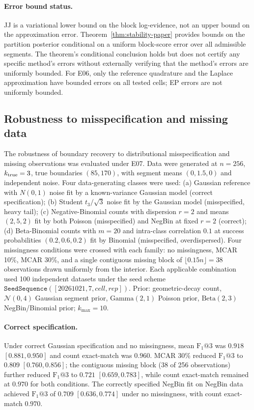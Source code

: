 \paragraph{Error bound status.}
JJ is a variational lower bound on the block log-evidence, not an upper bound on the
approximation error. Theorem~\ref{thm:stability-paper} provides bounds on the partition
posterior conditional on a uniform block-score error over all admissible segments. The
theorem's conditional conclusion holds but does not certify any specific method's errors
without externally verifying that the method's errors are uniformly bounded. For E06, only
the reference quadrature and the Laplace approximation have bounded errors on all tested
cells; EP errors are not uniformly bounded.





\FloatBarrier
\subsection{Robustness to misspecification and missing data}
The robustness of boundary recovery to distributional misspecification and missing
observations was evaluated under E07.
Data were generated at $n=256$, $k_{\rm true}=3$, true boundaries $(85,170)$,
with segment means $(0,1.5,0)$ and independent noise.
Four data-generating classes were used: (a) Gaussian reference with $N(0,1)$ noise
fit by a known-variance Gaussian model (correct specification);
(b) Student $t_3/\sqrt{3}$ noise fit by the Gaussian model (misspecified, heavy tail);
(c) Negative-Binomial counts with dispersion $r=2$ and means $(2,5,2)$ fit by both
Poisson (misspecified) and NegBin at fixed $r=2$ (correct);
(d) Beta-Binomial counts with $m=20$ and intra-class correlation $0.1$ at success
probabilities $(0.2,0.6,0.2)$ fit by Binomial (misspecified, overdispersed).
Four missingness conditions were crossed with each family: no missingness, MCAR 10\%,
MCAR 30\%, and a single contiguous missing block of $\lfloor 0.15n\rfloor = 38$
observations drawn uniformly from the interior.
Each applicable combination used 100 independent datasets under the
seed scheme $\mathtt{SeedSequence}([20261021,7,\textit{cell},\textit{rep}])$.
Prior: geometric-decay count, $\mathcal{N}(0,4)$ Gaussian segment prior,
$\mathrm{Gamma}(2,1)$ Poisson prior, $\mathrm{Beta}(2,3)$ NegBin/Binomial prior;
$k_{\max}=10$.

\paragraph{Correct specification.}
Under correct Gaussian specification and no missingness, mean
$\mathrm{F}_1@3$ was $0.918$ $[0.881, 0.950]$ and count exact-match was
$0.960$. MCAR 30\% reduced $\mathrm{F}_1@3$ to $0.809$ $[0.760, 0.856]$;
the contiguous missing block (38 of 256 observations) further reduced
$\mathrm{F}_1@3$ to $0.721$ $[0.659, 0.783]$, while count exact-match
remained at $0.970$ for both conditions.
The correctly specified NegBin fit on NegBin data achieved $\mathrm{F}_1@3$
of $0.709$ $[0.636, 0.774]$ under no missingness, with count exact-match
$0.970$.

